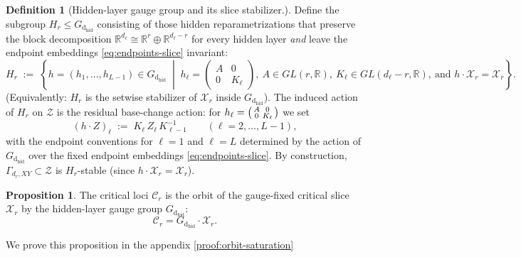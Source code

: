 \documentclass{article}
\newcommand{\dhid}{\operatorname{d_{hid}}}
\newcommand{\R}{\mathbb{R}}
\theoremstyle{definition}
\newtheorem{proposition}[theorem]{Proposition}
\newtheorem{definition}[theorem]{Definition}
\begin{document}
\begin{definition}[Hidden-layer gauge group and its slice stabilizer.]
Define the subgroup $H_{r}\le G_{\dhid}$ consisting of those hidden reparametrizations that preserve the block decomposition
$\R^{d_\ell}\cong \R^r\oplus \R^{d_\ell-r}$ for every hidden layer \emph{and} leave the endpoint embeddings
\eqref{eq:endpoints-slice} invariant:
\begin{equation}\label{eq:Hrsigma-def}
H_{r}
\;:=\;
\left\{
h=(h_1,\dots,h_{L-1})\in G_{\dhid} \;\middle|\;
h_\ell=
\begin{pmatrix}
A & 0\\
0 & K_\ell
\end{pmatrix},
\ A\in GL(r,\R),\ K_\ell\in GL(d_\ell-r,\R),
\ \text{and } h\cdot \mathcal X_r =\mathcal X_r
\right\}.
\end{equation}
(Equivalently: $H_{r}$ is the setwise stabilizer of $\mathcal X_{r}$ inside $G_{\dhid}$).
\noindent
The induced action of $H_{r}$ on $\mathcal Z$ is the residual base-change action:
for $h_\ell=\begin{psmallmatrix}A&0\\0&K_\ell\end{psmallmatrix}$ we set
\begin{equation}\label{eq:Hrsigma-on-Z}
(h\cdot Z)_\ell \;:=\; K_\ell\, Z_\ell\, K_{\ell-1}^{-1}
\qquad (\ell=2,\dots,L-1),
\end{equation}
with the endpoint conventions for $\ell=1$ and $\ell=L$ determined by the action of $G_{\dhid}$ over the fixed endpoint embeddings
\eqref{eq:endpoints-slice}.
By construction, $\Gamma_{d_r,XY}\subset \mathcal Z$ is $H_{r}$-stable (since
$h\cdot \mathcal X_{r}=\mathcal X_{r}$).
\end{definition}
\noindent
\begin{proposition}\label{prop:orbit-saturation}
The critical loci $\mathcal{C}_r$ is the orbit of the gauge-fixed critical slice $\mathcal{X}_{r}$ by the hidden-layer gauge group $G_{\dhid}$:
\begin{equation}\label{eq:orbit-saturation}
\mathcal{C}_r = G_{\dhid} \cdot \mathcal{X}_{r}.
\end{equation}
\end{proposition}
\noindent
We prove this proposition in the appendix \ref{proof:orbit-saturation}
\end{document}
